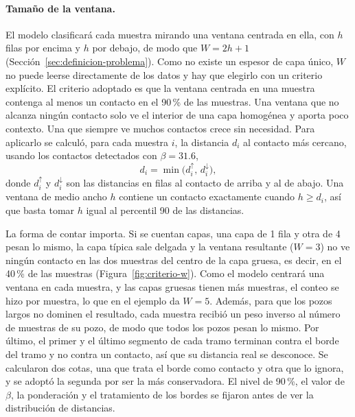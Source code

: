 \documentclass[11pt,a4paper]{article}
\begin{document}
\paragraph{Tamaño de la ventana.} El modelo clasificará cada muestra mirando una ventana centrada en ella, con $h$ filas por encima y $h$ por debajo, de modo que $W = 2h + 1$ (Sección~\ref{sec:definicion-problema}). Como no existe un espesor de capa único, $W$ no puede leerse directamente de los datos y hay que elegirlo con un criterio explícito. El criterio adoptado es que la ventana centrada en una muestra contenga al menos un contacto en el 90\,\% de las muestras. Una ventana que no alcanza ningún contacto solo ve el interior de una capa homogénea y aporta poco contexto. Una que siempre ve muchos contactos crece sin necesidad. Para aplicarlo se calculó, para cada muestra $i$, la distancia $d_i$ al contacto más cercano, usando los contactos detectados con $\beta = 31.6$,
\begin{equation}
d_i = \min\bigl(d_i^{\uparrow},\, d_i^{\downarrow}\bigr),
\label{eq:distancia-contacto}
\end{equation}
donde $d_i^{\uparrow}$ y $d_i^{\downarrow}$ son las distancias en filas al contacto de arriba y al de abajo. Una ventana de medio ancho $h$ contiene un contacto exactamente cuando $h \ge d_i$, así que basta tomar $h$ igual al percentil 90 de las distancias.

La forma de contar importa. Si se cuentan capas, una capa de 1 fila y otra de 4 pesan lo mismo, la capa típica sale delgada y la ventana resultante ($W = 3$) no ve ningún contacto en las dos muestras del centro de la capa gruesa, es decir, en el 40\,\% de las muestras (Figura~\ref{fig:criterio-w}). Como el modelo centrará una ventana en cada muestra, y las capas gruesas tienen más muestras, el conteo se hizo por muestra, lo que en el ejemplo da $W = 5$. Además, para que los pozos largos no dominen el resultado, cada muestra recibió un peso inverso al número de muestras de su pozo, de modo que todos los pozos pesan lo mismo. Por último, el primer y el último segmento de cada tramo terminan contra el borde del tramo y no contra un contacto, así que su distancia real se desconoce. Se calcularon dos cotas, una que trata el borde como contacto y otra que lo ignora, y se adoptó la segunda por ser la más conservadora. El nivel de 90\,\%, el valor de $\beta$, la ponderación y el tratamiento de los bordes se fijaron antes de ver la distribución de distancias.
\end{document}
